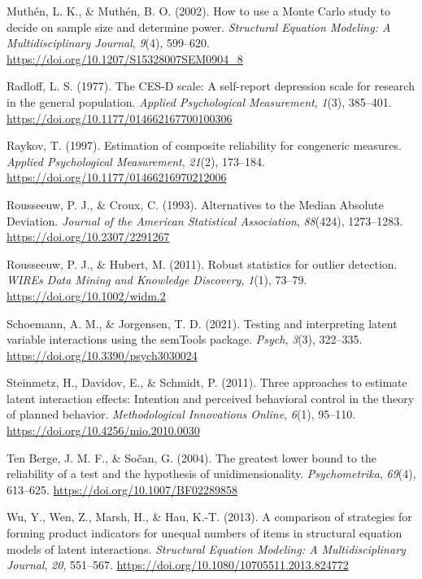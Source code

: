 \documentclass[
  man]{apa6}
\newlength{\cslhangindent}
\newenvironment{CSLReferences}[2] %
 {\begin{list}{}{%
  \setlength{\itemindent}{0pt}
  \setlength{\leftmargin}{0pt}
  \setlength{\parsep}{0pt}
  \ifodd #1
   \setlength{\leftmargin}{\cslhangindent}
   \setlength{\itemindent}{-1\cslhangindent}
  \fi
  \setlength{\itemsep}{#2\baselineskip}}}
 {\end{list}}
\begin{document}
\begin{CSLReferences}{1}{0}
Muthén, L. K., \& Muthén, B. O. (2002). How to use a {Monte Carlo} study to decide on sample size and determine power. \emph{Structural Equation Modeling: A Multidisciplinary Journal}, \emph{9}(4), 599--620. \url{https://doi.org/10.1207/S15328007SEM0904_8}

Radloff, L. S. (1977). The {CES-D} scale: {A} self-report depression scale for research in the general population. \emph{Applied Psychological Measurement}, \emph{1}(3), 385--401. \url{https://doi.org/10.1177/014662167700100306}

Raykov, T. (1997). Estimation of composite reliability for congeneric measures. \emph{Applied Psychological Measurement}, \emph{21}(2), 173--184. \url{https://doi.org/10.1177/01466216970212006}

Rousseeuw, P. J., \& Croux, C. (1993). Alternatives to the {Median Absolute Deviation}. \emph{Journal of the American Statistical Association}, \emph{88}(424), 1273--1283. \url{https://doi.org/10.2307/2291267}

Rousseeuw, P. J., \& Hubert, M. (2011). Robust statistics for outlier detection. \emph{WIREs Data Mining and Knowledge Discovery}, \emph{1}(1), 73--79. \url{https://doi.org/10.1002/widm.2}

Schoemann, A. M., \& Jorgensen, T. D. (2021). Testing and interpreting latent variable interactions using the {semTools} package. \emph{Psych}, \emph{3}(3), 322--335. \url{https://doi.org/10.3390/psych3030024}

Steinmetz, H., Davidov, E., \& Schmidt, P. (2011). Three approaches to estimate latent interaction effects: {Intention} and perceived behavioral control in the theory of planned behavior. \emph{Methodological Innovations Online}, \emph{6}(1), 95--110. \url{https://doi.org/10.4256/mio.2010.0030}

Ten Berge, J. M. F., \& Sočan, G. (2004). The greatest lower bound to the reliability of a test and the hypothesis of unidimensionality. \emph{Psychometrika}, \emph{69}(4), 613--625. \url{https://doi.org/10.1007/BF02289858}

Wu, Y., Wen, Z., Marsh, H., \& Hau, K.-T. (2013). A comparison of strategies for forming product indicators for unequal numbers of items in structural equation models of latent interactions. \emph{Structural Equation Modeling: A Multidisciplinary Journal}, \emph{20}, 551--567. \url{https://doi.org/10.1080/10705511.2013.824772}

\end{CSLReferences}
\end{document}
